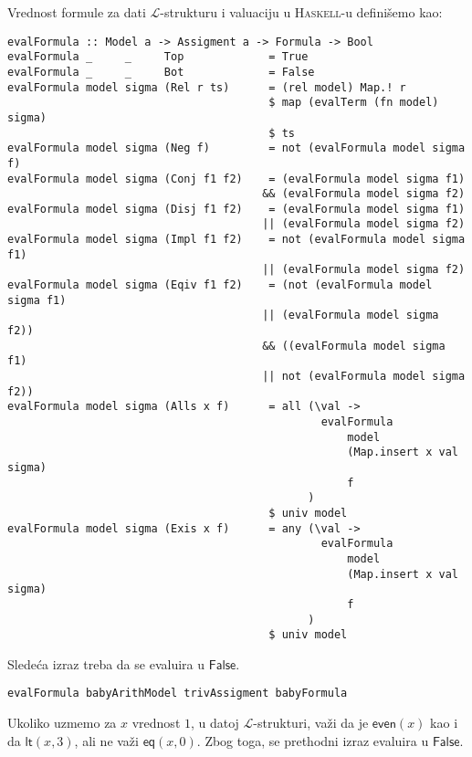 \documentclass[a4paper,10pt]{article}
\theoremstyle{definition}
\begin{document}
Vrednost formule za dati $\mathcal{L}$-strukturu i valuaciju u \textsc{Haskell}-u definišemo kao:
\begin{lstlisting}
evalFormula :: Model a -> Assigment a -> Formula -> Bool
evalFormula _     _     Top             = True
evalFormula _     _     Bot             = False
evalFormula model sigma (Rel r ts)      = (rel model) Map.! r
                                        $ map (evalTerm (fn model) sigma) 
                                        $ ts
evalFormula model sigma (Neg f)         = not (evalFormula model sigma f)
evalFormula model sigma (Conj f1 f2)    = (evalFormula model sigma f1) 
                                       && (evalFormula model sigma f2)
evalFormula model sigma (Disj f1 f2)    = (evalFormula model sigma f1) 
                                       || (evalFormula model sigma f2)
evalFormula model sigma (Impl f1 f2)    = not (evalFormula model sigma f1) 
                                       || (evalFormula model sigma f2)
evalFormula model sigma (Eqiv f1 f2)    = (not (evalFormula model sigma f1) 
                                       || (evalFormula model sigma f2))
                                       && ((evalFormula model sigma f1) 
                                       || not (evalFormula model sigma f2))
evalFormula model sigma (Alls x f)      = all (\val -> 
                                                evalFormula 
                                                    model 
                                                    (Map.insert x val sigma) 
                                                    f
                                              )
                                        $ univ model
evalFormula model sigma (Exis x f)      = any (\val -> 
                                                evalFormula 
                                                    model 
                                                    (Map.insert x val sigma) 
                                                    f
                                              )
                                        $ univ model

\end{lstlisting}
Sledeća izraz treba da se evaluira u $\mathsf{False}$.
\begin{lstlisting}
evalFormula babyArithModel trivAssigment babyFormula
\end{lstlisting}
Ukoliko uzmemo za $x$ vrednost $1$, u datoj $\mathcal{L}$-strukturi, važi da je $\mathsf{even}(x)$ kao i da $\mathsf{lt}(x, 3)$, ali ne važi $\mathsf{eq}(x, 0)$. Zbog toga, se prethodni izraz evaluira u $\mathsf{False}$.
\end{document}
